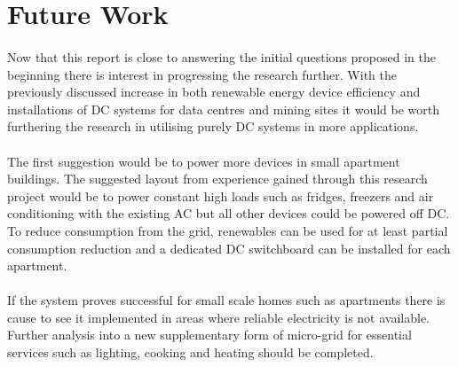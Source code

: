 \section{Future Work}

\paragraph{}
Now that this report is close to answering the initial questions proposed in the beginning there is interest in progressing the research further. With the previously discussed increase in both renewable energy device efficiency and installations of DC systems for data centres and mining sites it would be worth furthering the research in utilising purely DC systems in more applications. 

\paragraph{}
The first suggestion would be to power more devices in small apartment buildings. The suggested layout from experience gained through this research project would be to power constant high loads such as fridges, freezers and air conditioning with the existing AC but all other devices could be powered off DC. To reduce consumption from the grid, renewables can be used for at least partial consumption reduction and a dedicated DC switchboard can be installed for each apartment. 

\paragraph{}
If the system proves successful for small scale homes such as apartments there is cause to see it implemented in areas where reliable electricity is not available. Further analysis into a new supplementary form of micro-grid for essential services such as lighting, cooking and heating should be completed. 

\newpage